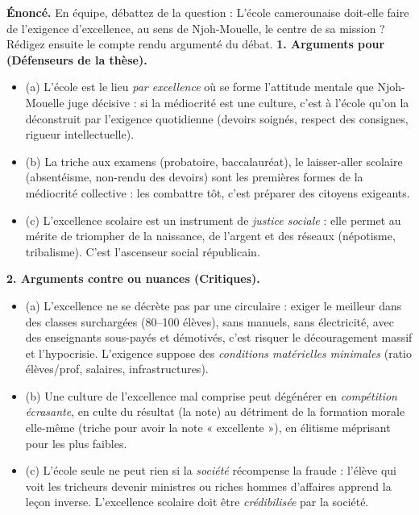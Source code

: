\documentclass[11pt]{article}
\begin{document}
\begin{exoresolu}
\textbf{Énoncé.} En équipe, débattez de la question : \guillemotleft L'école camerounaise doit-elle faire de l'exigence d'excellence, au sens de Njoh-Mouelle, le centre de sa mission ? \guillemotright Rédigez ensuite le compte rendu argumenté du débat.
\tcblower
\textbf{1. Arguments pour (Défenseurs de la thèse).}
\begin{itemize}
\item (a) L'école est le lieu \emph{par excellence} où se forme l'attitude mentale que Njoh-Mouelle juge décisive : si la médiocrité est une culture, c'est à l'école qu'on la déconstruit par l'exigence quotidienne (devoirs soignés, respect des consignes, rigueur intellectuelle).
\item (b) La triche aux examens (probatoire, baccalauréat), le laisser-aller scolaire (absentéisme, non-rendu des devoirs) sont les premières formes de la médiocrité collective : les combattre tôt, c'est préparer des citoyens exigeants.
\item (c) L'excellence scolaire est un instrument de \emph{justice sociale} : elle permet au mérite de triompher de la naissance, de l'argent et des réseaux (népotisme, tribalisme). C'est l'ascenseur social républicain.
\end{itemize}

\textbf{2. Arguments contre ou nuances (Critiques).}
\begin{itemize}
\item (a) L'excellence ne se décrète pas par une circulaire : exiger le meilleur dans des classes surchargées (80--100 élèves), sans manuels, sans électricité, avec des enseignants sous-payés et démotivés, c'est risquer le découragement massif et l'hypocrisie. L'exigence suppose des \emph{conditions matérielles minimales} (ratio élèves/prof, salaires, infrastructures).
\item (b) Une culture de l'excellence mal comprise peut dégénérer en \emph{compétition écrasante}, en culte du résultat (la note) au détriment de la formation morale elle-même (triche pour avoir la note « excellente »), en élitisme méprisant pour les plus faibles.
\item (c) L'école seule ne peut rien si la \emph{société} récompense la fraude : l'élève qui voit les tricheurs devenir ministres ou riches hommes d'affaires apprend la leçon inverse. L'excellence scolaire doit être \emph{crédibilisée} par la société.
\end{itemize}


\end{exoresolu}
\end{document}

